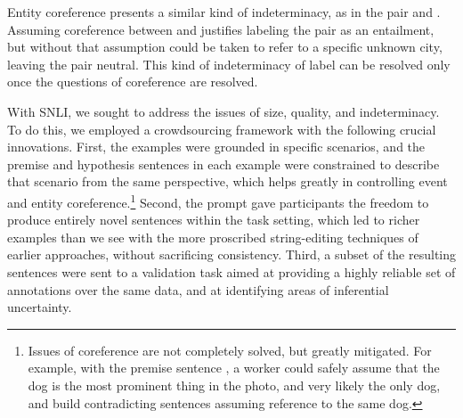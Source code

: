 Entity coreference presents a similar kind of indeterminacy, as in the pair  and . Assuming coreference between  and  justifies labeling the pair as an entailment, but without that assumption  could be taken to refer to a specific unknown city, leaving the pair neutral. This kind of indeterminacy of label can be resolved only once the questions of coreference are resolved.

With SNLI, we sought to address the issues of size, quality, and
indeterminacy. To do this, we employed a crowdsourcing framework with
the following crucial innovations. First, the examples were grounded
in specific scenarios, and the premise and hypothesis sentences in each example 
were constrained to describe that scenario from the same perspective, 
which helps greatly in controlling event and entity coreference.\footnote{
Issues of coreference are not completely solved, but greatly mitigated. For example, with the premise sentence , a worker could safely assume that the dog is the most prominent thing in the photo, and very likely the only dog, and  build contradicting sentences assuming reference to the same dog.
} 
Second, the prompt
gave participants the freedom to produce entirely novel sentences
within the task setting, which led to richer examples than we see with
the more proscribed string-editing techniques of earlier approaches,
without sacrificing consistency. Third, a subset of the resulting
sentences were sent to a validation task aimed at providing a highly 
reliable set of annotations over the same data, and at identifying areas of inferential uncertainty.



